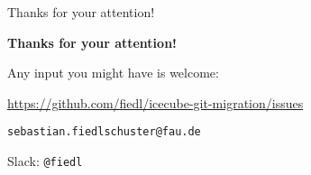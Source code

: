 
\begin{frame}{Thanks for your attention!}
  \begin{center}
    \Large \textbf{Thanks for your attention!}
    \vspace{2em}

    \normalsize
    Any input you might have is welcome: \\ \vspace{0.3cm}

    \url{https://github.com/fiedl/icecube-git-migration/issues} \\ \vspace{0.2cm}

    \texttt{sebastian.fiedlschuster@fau.de}

    Slack: \texttt{@fiedl}

    \vspace{1.5cm}

  \end{center}
\end{frame}
